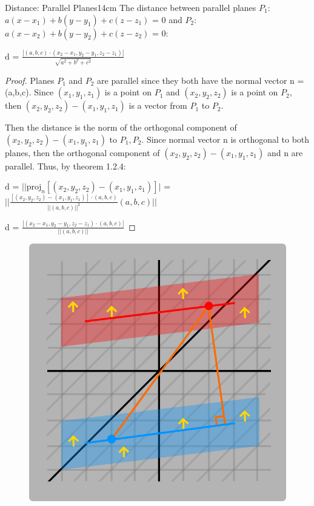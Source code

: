     \begin{wtheorem}{Distance: Parallel Planes}{14cm}
        The distance between parallel planes
        $P_1$: $a(x-x_1) + b(y-y_1) + c(z-z_1)$ = 0
        and $P_2$: $a(x-x_2) + b(y-y_2) + c(z-z_2)$ = 0:

        \hspace{0.5cm}
        d = $\frac{|(a,b,c) \cdot (x_2-x_1,y_2-y_1,z_2-z_1)|}{\sqrt{a^2+b^2+c^2}}$
    \end{wtheorem}

    \begin{proof}
        Planes $P_1$ and $P_2$ are parallel since they both have the normal vector
        n = (a,b,c).
        Since $(x_1,y_1,z_1)$ is a point on $P_1$ and
        $(x_2,y_2,z_2)$ is a point on $P_2$, then
        $(x_2,y_2,z_2) - (x_1,y_1,z_1)$ is a vector from $P_1$ to $P_2$.

        Then the distance is the norm of the orthogonal component of
        $(x_2,y_2,z_2) - (x_1,y_1,z_1)$ to $P_1,P_2$.
        Since normal vector n is orthogonal to both planes, then
        the orthogonal component of $(x_2,y_2,z_2) - (x_1,y_1,z_1)$
        and n are parallel.
        Thus, by {\color{red} theorem 1.2.4}:

        \hspace{0.5cm}
        d = $||\text{proj}_n[(x_2,y_2,z_2) - (x_1,y_1,z_1)]|$
        = $||\frac{[(x_2,y_2,z_2) - (x_1,y_1,z_1)] \cdot (a,b,c)}
                    {||(a,b,c)||^2}(a,b,c)||$

        \hspace{0.5cm}
        d = $\frac{|(x_2-x_1,y_2-y_1,z_2-z_1) \cdot (a,b,c)|}
        {||(a,b,c)||}$
    \end{proof}

    \begin{figure}[h]
        \centering
        \includegraphics[scale=0.3]{Images/1.4.4.png}
    \end{figure}


